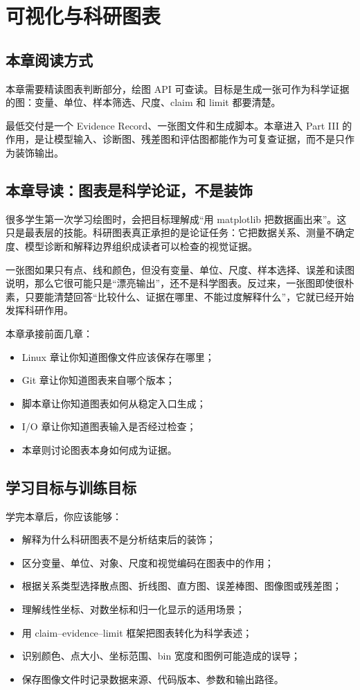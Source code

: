 \chapter{可视化与科研图表}

\section{本章阅读方式}

本章需要精读图表判断部分，绘图 API 可查读。目标是生成一张可作为科学证据的图：变量、单位、样本筛选、尺度、claim 和 limit 都要清楚。

最低交付是一个 Evidence Record、一张图文件和生成脚本。本章进入 Part III 的作用，是让模型输入、诊断图、残差图和评估图都能作为可复查证据，而不是只作为装饰输出。

\section{本章导读：图表是科学论证，不是装饰}

很多学生第一次学习绘图时，会把目标理解成“用 matplotlib 把数据画出来”。这只是最表层的技能。科研图表真正承担的是论证任务：它把数据关系、测量不确定度、模型诊断和解释边界组织成读者可以检查的视觉证据。

一张图如果只有点、线和颜色，但没有变量、单位、尺度、样本选择、误差和读图说明，那么它很可能只是“漂亮输出”，还不是科学图表。反过来，一张图即使很朴素，只要能清楚回答“比较什么、证据在哪里、不能过度解释什么”，它就已经开始发挥科研作用。

本章承接前面几章：

\begin{itemize}
    \item Linux 章让你知道图像文件应该保存在哪里；
    \item Git 章让你知道图表来自哪个版本；
    \item 脚本章让你知道图表如何从稳定入口生成；
    \item I/O 章让你知道图表输入是否经过检查；
    \item 本章则讨论图表本身如何成为证据。
\end{itemize}

\section{学习目标与训练目标}

学完本章后，你应该能够：

\begin{itemize}
    \item 解释为什么科研图表不是分析结束后的装饰；
    \item 区分变量、单位、对象、尺度和视觉编码在图表中的作用；
    \item 根据关系类型选择散点图、折线图、直方图、误差棒图、图像图或残差图；
    \item 理解线性坐标、对数坐标和归一化显示的适用场景；
    \item 用 claim--evidence--limit 框架把图表转化为科学表述；
    \item 识别颜色、点大小、坐标范围、bin 宽度和图例可能造成的误导；
    \item 保存图像文件时记录数据来源、代码版本、参数和输出路径。
\end{itemize}

